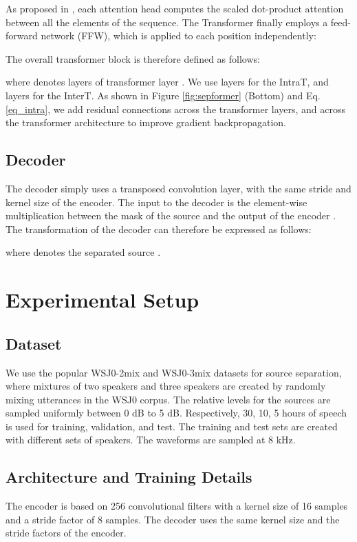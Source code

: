 \documentclass{article}
\begin{document}
As proposed in \cite{vaswani2017}, each attention head computes the scaled dot-product attention between all the elements of the sequence.
The Transformer finally employs a feed-forward network (FFW), which is applied to each position independently:

The overall transformer block is therefore defined as follows:

where  denotes  layers of transformer layer . We use  layers for the IntraT, and  layers for the InterT.
As shown in Figure \ref{fig:sepformer} (Bottom) and Eq. \eqref{eq_intra}, we add residual connections across the transformer layers, and across the transformer architecture to improve gradient backpropagation. 

\vspace{-0.2cm}
\subsection{Decoder}
The decoder simply uses a transposed convolution layer, with the same stride and kernel size of the encoder. The input to the decoder is the element-wise multiplication between the mask  of the source  and the output of the encoder . The transformation of the decoder can therefore be expressed as follows: 

\vspace{-0.3cm}
where  denotes the separated source . 

\section{Experimental Setup}
\vspace{-0.2cm}
\subsection{Dataset}
We use the popular WSJ0-2mix and WSJ0-3mix datasets \cite{hershey2015deep} for source separation, where mixtures of two speakers and three speakers are created by randomly mixing utterances in the WSJ0 corpus. The relative levels for the sources are sampled uniformly between 0 dB to 5 dB. Respectively, 30, 10, 5 hours of speech is used for training, validation, and test. The training and test sets are created with different sets of speakers. The waveforms are sampled at 8 kHz.


\vspace{-0.2cm}
\subsection{Architecture and Training Details}
\label{sec:arcdetails}
The encoder is based on 256 convolutional filters with a kernel size of 16 samples and a stride factor of 8 samples. The decoder uses the same kernel size and the stride factors of the encoder. 
\end{document}

